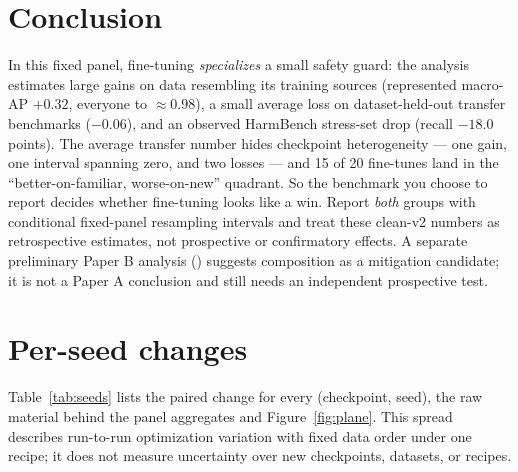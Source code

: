 \documentclass[11pt]{article}
\begin{document}
\section{Conclusion}
In this fixed panel, fine-tuning \emph{specializes} a small safety guard: the analysis estimates
large gains on data resembling its training sources (represented macro-AP $+0.32$, everyone to
${\approx}0.98$), a small average loss on dataset-held-out transfer benchmarks ($-0.06$), and
an observed HarmBench stress-set drop (recall $-18.0$ points). The average transfer number hides
checkpoint heterogeneity --- one gain, one interval spanning zero, and two losses --- and 15 of 20 fine-tunes land in the
``better-on-familiar, worse-on-new'' quadrant. So the benchmark you choose to report decides
whether fine-tuning looks like a win. Report \emph{both} groups with conditional fixed-panel
resampling intervals and treat these clean-v2 numbers as retrospective estimates, not prospective
or confirmatory effects. A separate preliminary
Paper B analysis () suggests composition as a mitigation candidate; it is not a
Paper A conclusion and still needs an independent prospective test.

\appendix
\section{Per-seed changes}
Table~\ref{tab:seeds} lists the paired change for every (checkpoint, seed), the raw material
behind the panel aggregates and Figure~\ref{fig:plane}. This spread describes run-to-run
optimization variation with fixed data order under one recipe; it does not measure uncertainty
over new checkpoints, datasets, or recipes.
\end{document}

